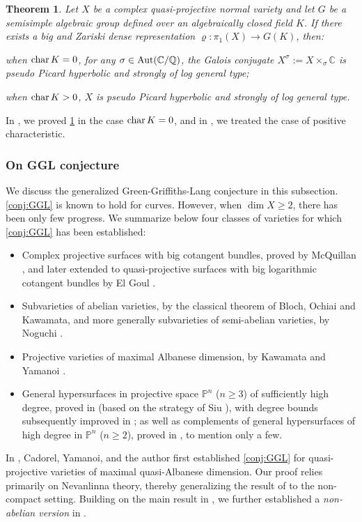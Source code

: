 \documentclass[english]{amsproc}
\theoremstyle{plain}
\newtheorem{thm}{Theorem}[section]
\theoremstyle{definition}
\theoremstyle{remark}
\theoremstyle{plain}
\numberwithin{equation}{thm} %
\newcommand{\bP}{\mathbb{P}}
\begin{document}
\begin{thm}\label{main:hyper}
	Let $X$ be a complex quasi-projective normal variety and let $G$ be a semisimple algebraic group defined over an algebraically closed field $K$. If there exists a big and Zariski dense representation $\varrho:\pi_1(X)\to G(K)$, then:
	\begin{thmlist}
		\item \label{item:hyper1} when ${\rm char}\, K = 0$, for any $\sigma\in {\rm Aut}(\mathbb{C}/\mathbb{Q})$, the Galois conjugate $X^\sigma := X\times_\sigma \mathbb{C}$ is pseudo Picard hyperbolic and strongly of log general type;
		\item \label{item:hyper2}when ${\rm char}\, K > 0$, $X$ is pseudo Picard hyperbolic and strongly of log general type.
	\end{thmlist}
\end{thm}

In \cite{CDY22}, we proved \cref{main:hyper} in the case ${\rm char}\, K = 0$, and in \cite{DY23b}, we treated the case of positive characteristic.

\subsubsection{On GGL conjecture}
We discuss the generalized Green-Griffiths-Lang conjecture in this subsection.   
\cref{conj:GGL} is known to hold for curves. However, when $\dim X \geq 2$, there has been only few progress. We summarize below four classes of varieties for which \cref{conj:GGL} has been established: 
\begin{itemize}
	\item Complex projective surfaces with big cotangent bundles, proved by McQuillan \cite{McQ}, and later extended to quasi-projective surfaces with big logarithmic cotangent bundles by El Goul \cite{ElG}.
	\item Subvarieties of abelian varieties, by the classical theorem of Bloch, Ochiai and Kawamata, and more generally subvarieties of semi-abelian varieties, by Noguchi \cite{Nog81}.
	\item Projective varieties of maximal Albanese dimension, by Kawamata \cite{Kaw81} and Yamanoi \cite{Yam15}.
	\item General hypersurfaces in projective space $\bP^n$ ($n \geq 3$) of sufficiently high degree, proved in \cite{DMR} (based on the strategy of Siu \cite{Siu02}), with degree bounds subsequently improved in \cite{Dar16,MT,BK24,Cad24}; as well as complements of general hypersurfaces of high degree in $\bP^n$ ($n \geq 2$), proved in \cite{Dar16,BD19}, to mention only a few.
\end{itemize}
In \cite{CDY25}, Cadorel, Yamanoi, and the author first established \cref{conj:GGL} for quasi-projective varieties of maximal quasi-Albanese dimension. Our proof relies primarily on Nevanlinna theory, thereby generalizing the result of \cite{Yam15} to the non-compact setting. Building on the main result in \cite{CDY25}, we further established a \emph{non-abelian version} in \cite{CDY22,DY23b}.
\end{document}
